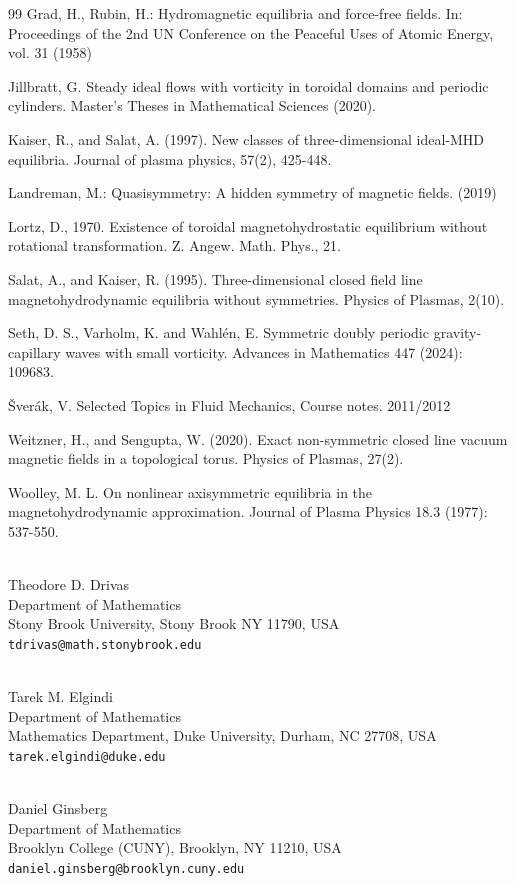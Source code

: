 \documentclass[11pt]{article}
\theoremstyle{plain}
\numberwithin{equation}{section}
\theoremstyle{remark}
\begin{document}
\begin{thebibliography}{99}
Grad, H., Rubin, H.: Hydromagnetic equilibria and force-free fields. In: Proceedings of the 2nd UN
Conference on the Peaceful Uses of Atomic Energy, vol. 31 (1958)

Jillbratt, G. Steady ideal flows with vorticity in toroidal domains and periodic cylinders. Master's Theses in Mathematical Sciences (2020).


Kaiser, R., and  Salat, A. (1997). New classes of three-dimensional ideal-MHD equilibria. Journal of plasma physics, 57(2), 425-448.


Landreman, M.: Quasisymmetry: A hidden symmetry of magnetic fields. (2019)

Lortz, D., 1970. Existence of toroidal magnetohydrostatic equilibrium without rotational transformation. Z.
Angew. Math. Phys., 21.

Salat, A., and  Kaiser, R. (1995). Three-dimensional closed field line magnetohydrodynamic equilibria without symmetries. Physics of Plasmas, 2(10).

Seth, D. S.,  Varholm, K. and  Wahlén, E. Symmetric doubly periodic gravity-capillary waves with small vorticity. Advances in Mathematics 447 (2024): 109683.

Šverák, V. Selected Topics in Fluid Mechanics, Course notes. 2011/2012

Weitzner, H., and Sengupta, W. (2020). Exact non-symmetric closed line vacuum magnetic fields in a topological torus. Physics of Plasmas, 27(2).

Woolley, M. L. On nonlinear axisymmetric equilibria in the magnetohydrodynamic approximation. Journal of Plasma Physics 18.3 (1977): 537-550.

\end{thebibliography}




\vspace{-4mm}

\qquad\\
Theodore D. Drivas\\
Department of Mathematics\\
Stony Brook University, Stony Brook NY 11790, USA\\
{\tt tdrivas@math.stonybrook.edu}


\qquad\\
Tarek M. Elgindi\\
Department of Mathematics\\
Mathematics Department, Duke University, Durham, NC 27708, USA\\
{\tt  tarek.elgindi@duke.edu}



\qquad\\
Daniel Ginsberg\\
Department of Mathematics\\
Brooklyn College (CUNY), Brooklyn, NY 11210, USA\\
{\tt daniel.ginsberg@brooklyn.cuny.edu}
\end{document}

